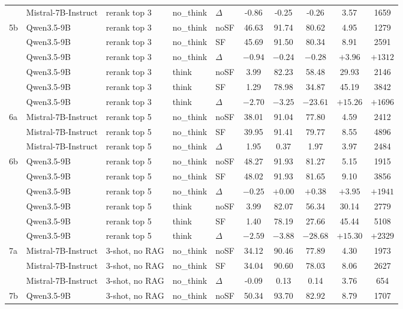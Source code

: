 \begin{scriptsize}
\begin{longtable}{l l l l l c c c c c}
 & Mistral-7B-Instruct & rerank top 3 & no\_think & $\Delta$ & -0.86 & -0.25 & -0.26 & 3.57 & 1659 \\
5b & Qwen3.5-9B & rerank top 3 & no\_think & noSF & 46.63 & 91.74 & 80.62 & 4.95 & 1279 \\
 & Qwen3.5-9B & rerank top 3 & no\_think & SF & 45.69 & 91.50 & 80.34 & 8.91 & 2591 \\
 & Qwen3.5-9B & rerank top 3 & no\_think & $\Delta$ & $-0.94$ & $-0.24$ & $-0.28$ & $+3.96$ & $+1312$ \\
 & Qwen3.5-9B & rerank top 3 & think & noSF & 3.99 & 82.23 & 58.48 & 29.93 & 2146 \\
 & Qwen3.5-9B & rerank top 3 & think & SF & 1.29 & 78.98 & 34.87 & 45.19 & 3842 \\
 & Qwen3.5-9B & rerank top 3 & think & $\Delta$ & $-2.70$ & $-3.25$ & $-23.61$ & $+15.26$ & $+1696$ \\
\dmidrule
6a & Mistral-7B-Instruct & rerank top 5 & no\_think & noSF & 38.01 & 91.04 & 77.80 & 4.59 & 2412 \\
 & Mistral-7B-Instruct & rerank top 5 & no\_think & SF & 39.95 & 91.41 & 79.77 & 8.55 & 4896 \\
 & Mistral-7B-Instruct & rerank top 5 & no\_think & $\Delta$ & 1.95 & 0.37 & 1.97 & 3.97 & 2484 \\
6b & Qwen3.5-9B & rerank top 5 & no\_think & noSF & 48.27 & 91.93 & 81.27 & 5.15 & 1915 \\
 & Qwen3.5-9B & rerank top 5 & no\_think & SF & 48.02 & 91.93 & 81.65 & 9.10 & 3856 \\
 & Qwen3.5-9B & rerank top 5 & no\_think & $\Delta$ & $-0.25$ & $+0.00$ & $+0.38$ & $+3.95$ & $+1941$ \\
 & Qwen3.5-9B & rerank top 5 & think & noSF & 3.99 & 82.07 & 56.34 & 30.14 & 2779 \\
 & Qwen3.5-9B & rerank top 5 & think & SF & 1.40 & 78.19 & 27.66 & 45.44 & 5108 \\
 & Qwen3.5-9B & rerank top 5 & think & $\Delta$ & $-2.59$ & $-3.88$ & $-28.68$ & $+15.30$ & $+2329$ \\
\dmidrule
7a & Mistral-7B-Instruct & 3-shot, no RAG & no\_think & noSF & 34.12 & 90.46 & 77.89 & 4.30 & 1973 \\
 & Mistral-7B-Instruct & 3-shot, no RAG & no\_think & SF & 34.04 & 90.60 & 78.03 & 8.06 & 2627 \\
 & Mistral-7B-Instruct & 3-shot, no RAG & no\_think & $\Delta$ & -0.09 & 0.13 & 0.14 & 3.76 & 654 \\
7b & Qwen3.5-9B & 3-shot, no RAG & no\_think & noSF & 50.34 & 93.70 & 82.92 & 8.79 & 1707 \\

\end{longtable}
\end{scriptsize}
